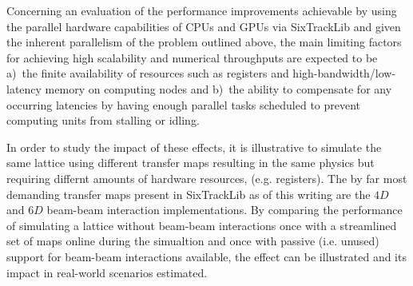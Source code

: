 \documentclass[a4paper,
              ]{jacow}
\begin{document}
Concerning an evaluation of the performance improvements achievable by using the parallel hardware capabilities of CPUs and GPUs via SixTrackLib and given the inherent parallelism of the problem outlined above, the main limiting factors for achieving high scalability and numerical throughputs are expected to be a)~the finite availability of resources such as registers and high-bandwidth/low-latency memory on computing nodes and 
b)~the ability to compensate for any occurring latencies by having enough parallel tasks scheduled to prevent computing units from stalling or idling. 

In order to study the impact of these effects, it is illustrative to simulate the same lattice using different transfer maps resulting in the same physics but requiring differnt amounts of hardware resources, (e.g. registers). The by far most demanding transfer maps present in SixTrackLib as of this writing are the $4D$ and $6D$ beam-beam interaction implementations. By comparing the performance of simulating a lattice without beam-beam interactions once with a streamlined set of maps online during the simualtion and once with passive (i.e. unused) support for beam-beam interactions available, the effect can be illustrated and its impact in real-world scenarios estimated.
\end{document}
